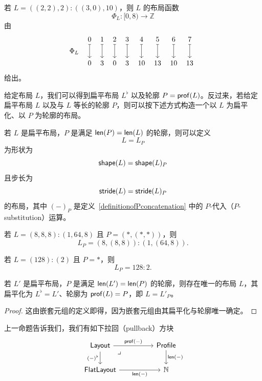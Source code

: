 \begin{example}
    若 $L = ((2,2),2):((3,0),10)$，则 $L$ 的布局函数
    \[
    \Phi_L:[0,8) \to \mathbb{Z}
    \]
    由
    \[ \begin{tikzcd} [row sep = 2, column sep = 4]
    & 0 \ar[dd,mapsto] & 1 \ar[dd,mapsto] & 2 \ar[dd,mapsto] & 3 \ar[dd,mapsto] & 4 \ar[dd,mapsto] & 5 \ar[dd,mapsto] & 6  \ar[dd,mapsto] &  7 \ar[dd,mapsto]\\
    \Phi_L & & &  & & & & & & \\
    & 0 & 3 & 0 & 3 & 10 & 13 & 10 & 13
    \end{tikzcd} \]
    给出。
\end{example}

给定布局 $L$，我们可以得到扁平布局 $L^\flat$ 以及轮廓 $P = \mathsf{prof}(L)$。反过来，若给定扁平布局 $L$ 以及与 $L$ 等长的轮廓 $P$，则可以按下述方式构造一个以 $L$ 为扁平化、以 $P$ 为轮廓的布局。

\begin{construction}\label{layoutfromflatlayoutandprofile}
若 $L$ 是扁平布局，$P$ 是满足 $\mathsf{len}(P) = \mathsf{len}(L)$ 的轮廓，则可以定义
\[
L = L_P
\]
为形状为
\[
\mathsf{shape}(L) = \mathsf{shape}(L)_P
\]
且步长为
\[
\mathsf{stride}(L) = \mathsf{stride}(L)_P
\]
的布局，其中 $(-)_P$ 是定义~\ref{definitionofPconcatenation} 中的 $P$-代入（$P$-substitution）运算。
\end{construction}

\begin{example}
    若 $L = (8,8,8):(1,64,8)$ 且 $P = (*,(*,*))$，则
    \[
    L_P = (8,(8,8)):(1,(64,8)).
    \]
\end{example}

\begin{example}
    若 $L = (128):(2)$ 且 $P = *$，则
    \[
    L_P = 128:2.
    \]
\end{example}

\begin{proposition}
    若 $L'$ 是扁平布局，$P$ 是满足 $\mathsf{len}(L') = \mathsf{len}(P)$ 的轮廓，则存在唯一的布局 $L$，其扁平化为 $L^\flat = L'$、轮廓为 $\mathsf{prof}(L) = P$，即 $L = L'_P$。
\end{proposition}

\begin{proof}
    这由嵌套元组的定义即得，因为嵌套元组由其扁平化与轮廓唯一确定。
\end{proof}

\begin{observation}
    上一命题告诉我们，我们有如下拉回（pullback）方块
    \[ \begin{tikzcd}
    \mathterm{Layout}\ar[rr,"\profile(-)"] \ar[d,swap,"(-)^\flat"] \arrow[drr, phantom, "\lrcorner", very near start] & & \mathterm{Profile}\ar[d,"\len(-)"] \\
    \mathterm{FlatLayout} \ar[rr,swap,"\len(-)"] & & \mathbb{N}
    \end{tikzcd} \]
\end{observation}

